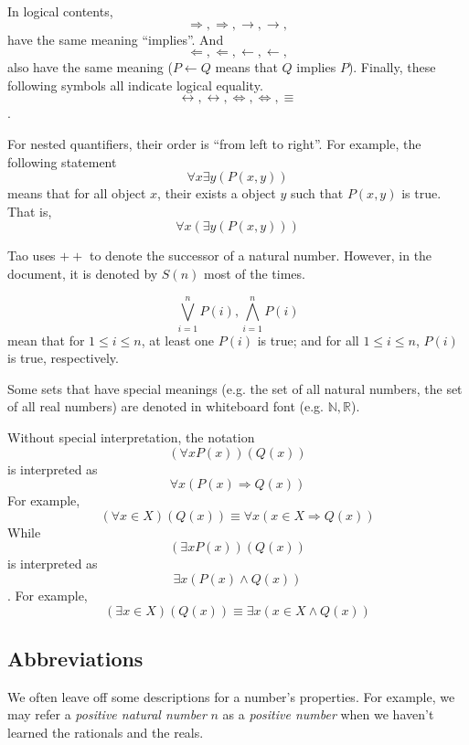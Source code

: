 In logical contents, 
\[
\Longrightarrow, \Rightarrow, \longrightarrow, \rightarrow, 
\]
have the same meaning ``implies''. And 
\[
\Longleftarrow, \Leftarrow, \longleftarrow, \leftarrow,
\]
also have the same meaning ($P \leftarrow Q$ means that $Q$ implies $P$).
Finally, these following symbols all indicate logical equality.
\[
\leftrightarrow, \longleftrightarrow, \Leftrightarrow, \Longleftrightarrow, \equiv
\].

For nested quantifiers, their order is ``from left to right''. For example, the following statement 
\[
\forall x \exists y (P(x,y))
\]
means that for all object $x$, their exists a object $y$ such that $P(x,y)$ is true.
That is,
\[
\forall x(\exists y(P(x,y)))
\]

Tao uses $++$ to denote the successor of a natural number. However, in the document, it is denoted by 
$S(n)$ most of the times.

\[
\bigvee_{i=1}^{n} P(i), \bigwedge_{i=1}^{n} P(i)
\]
mean that for $1\leq i \leq n$, at least one $P(i)$ is true; and for all $1\leq i \leq n$, $P(i)$ is 
true, respectively.

Some sets that have special meanings (e.g. the set of all natural numbers, the set of all real numbers) 
are denoted in whiteboard font (e.g. $\mathbb{N}, \mathbb{R}$).

Without special interpretation, the notation
\[
(\forall x P(x))(Q(x))
\]
is interpreted as 
\[
\forall x(P(x) \Longrightarrow Q(x))
\]
For example, 
\[
(\forall x \in X)(Q(x)) \equiv \forall x(x \in X \Longrightarrow Q(x))
\]
While
\[
(\exists x P(x))(Q(x))
\]
is interpreted as 
\[
\exists x(P(x) \wedge Q(x))
\].
For example,
\[
(\exists x \in X)(Q(x)) \equiv \exists x(x \in X \wedge Q(x))
\]

\subsection{Abbreviations}
We often leave off some descriptions for a number's properties. For example, we may refer a 
\emph{positive natural number} $n$ as a \emph{positive number} when we haven't learned the rationals and 
the reals.